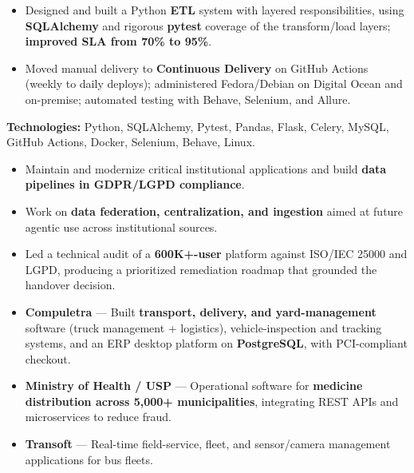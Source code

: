 \documentclass[10pt,a4paper]{altacv}
\begin{document}
\begin{itemize}
\setlength{\itemindent}{0.5em}
\item[--] Designed and built a Python \textbf{ETL} system with layered responsibilities, using \textbf{SQLAlchemy} and rigorous \textbf{pytest} coverage of the transform/load layers; \textbf{improved SLA from 70\% to 95\%}.
\item[--] Moved manual delivery to \textbf{Continuous Delivery} on GitHub Actions (weekly to daily deploys); administered Fedora/Debian on Digital Ocean and on-premise; automated testing with Behave, Selenium, and Allure.
\end{itemize}
\textbf{Technologies:} Python, SQLAlchemy, Pytest, Pandas, Flask, Celery, MySQL, GitHub Actions, Docker, Selenium, Behave, Linux.

\break
\newpage
{}

\begin{itemize}
\setlength{\itemindent}{0.5em}
\item[--] Maintain and modernize critical institutional applications and build \textbf{data pipelines in GDPR/LGPD compliance}.
\item[--] Work on \textbf{data federation, centralization, and ingestion} aimed at future agentic use across institutional sources.
\item[--] Led a technical audit of a \textbf{600K+-user} platform against ISO/IEC 25000 and LGPD, producing a prioritized remediation roadmap that grounded the handover decision.
\end{itemize}
\vspace{2mm}

\begin{itemize}
\setlength{\itemindent}{0.5em}
\item[--] \textbf{Compuletra} — Built \textbf{transport, delivery, and yard-management} software (truck management + logistics), vehicle-inspection and tracking systems, and an ERP desktop platform on \textbf{PostgreSQL}, with PCI-compliant checkout.
\item[--] \textbf{Ministry of Health / USP} — Operational software for \textbf{medicine distribution across 5,000+ municipalities}, integrating REST APIs and microservices to reduce fraud.
\item[--] \textbf{Transoft} — Real-time field-service, fleet, and sensor/camera management applications for bus fleets.
\end{itemize}
\end{document}
